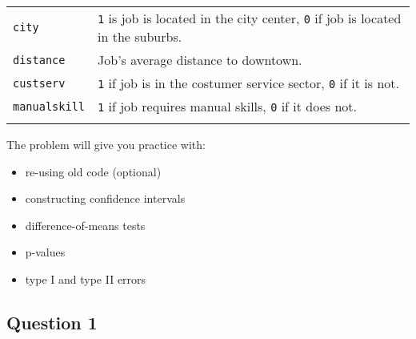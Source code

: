 \documentclass[]{article}
\begin{document}
\begin{longtable}[c]{@{}ll@{}}
\\\addlinespace
\begin{minipage}[t]{0.19\columnwidth}\raggedright
\texttt{city}
\end{minipage} & \begin{minipage}[t]{0.75\columnwidth}\raggedright
\texttt{1} is job is located in the city center, \texttt{0} if job is
located in the suburbs.
\end{minipage}
\\\addlinespace
\begin{minipage}[t]{0.19\columnwidth}\raggedright
\texttt{distance}
\end{minipage} & \begin{minipage}[t]{0.75\columnwidth}\raggedright
Job's average distance to downtown.
\end{minipage}
\\\addlinespace
\begin{minipage}[t]{0.19\columnwidth}\raggedright
\texttt{custserv}
\end{minipage} & \begin{minipage}[t]{0.75\columnwidth}\raggedright
\texttt{1} if job is in the costumer service sector, \texttt{0} if it is
not.
\end{minipage}
\\\addlinespace
\begin{minipage}[t]{0.19\columnwidth}\raggedright
\texttt{manualskill}
\end{minipage} & \begin{minipage}[t]{0.75\columnwidth}\raggedright
\texttt{1} if job requires manual skills, \texttt{0} if it does not.
\end{minipage}
\\\addlinespace
\bottomrule
\end{longtable}

The problem will give you practice with:

\begin{itemize}
\itemsep1pt\parskip0pt
\item
  re-using old code (optional)
\item
  constructing confidence intervals
\item
  difference-of-means tests
\item
  p-values
\item
  type I and type II errors
\end{itemize}

\subsection{Question 1}\label{question-1}
\end{document}
